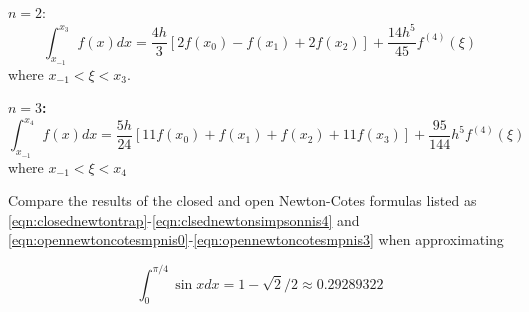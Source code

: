 {\bf $n=2:$}
\begin{equation}\label{eqn:opennewtoncotesmpnis2}
 \int_{x_{-1}}^{x_{3}} f(x) d x=\frac{4 h}{3}\left[2 f\left(x_{0}\right)-f\left(x_{1}\right)+2 f\left(x_{2}\right)\right]+\frac{14 h^{5}}{45} f^{(4)}(\xi) 
\end{equation}
 where  $ x_{-1}<\xi<x_{3}$.

{\bf $n=3$:}
\begin{equation}\label{eqn:opennewtoncotesmpnis3}
\int_{x_{-1}}^{x_{4}} f(x) d x=\frac{5 h}{24}\left[11 f\left(x_{0}\right)+f\left(x_{1}\right)+f\left(x_{2}\right)+11 f\left(x_{3}\right)\right]+\frac{95}{144} h^{5} f^{(4)}(\xi)
\end{equation}
where $x_{-1}<\xi<x_{4}$


\begin{example}
Compare the results of the closed and open Newton-Cotes formulas listed as \ref{eqn:closednewtontrap}-\ref{eqn:clsednewtonsimpsonnis4} and \ref{eqn:opennewtoncotesmpnis0}-\ref{eqn:opennewtoncotesmpnis3} when approximating

$$
\int_{0}^{\pi / 4} \sin x d x=1-\sqrt{2} / 2 \approx 0.29289322
$$
\end{example}

